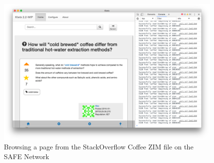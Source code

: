 \begin{figure}
	\begin{center}
		\includegraphics[width=\textwidth]{images/safe-wiki-browsing-coffee}
		\caption{Browsing a page from the StackOverflow Coffee ZIM file on the SAFE Network}
		\label{fig:browsing-coffee}
	\end{center}
\end{figure}










